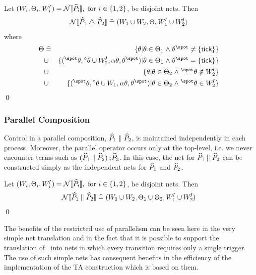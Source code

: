 \begin{definition}
Let $(W_i,\Theta_i,W^{\!I}_i) = {\mathcal{N}[\![{\widehat{P}}_i]\!]}, \text{ for } i \in \{1,2\}$, be
disjoint nets. Then
\[{\mathcal{N}[\![{\widehat{P}}_1 \mathrel{\mathord{\triangle}} {\widehat{P}}_2]\!]} \mathrel{\widehat=} (W_1 \cup W_2, \Theta, W^{\!I}_1 \cup W^{\!I}_2)\] where
\begin{eqnarray*}
\T & \defs & \{\tr | \tr \in \T_1 \land \postset{\tr} \neq \{\tickpl\}\} \\
   & \cup  & \{(\preset{\tr},\vset{\tr} \cup \WI_2,\attr{\tr},\postset{\tr}) |
                   \tr \in \T_1 \land \postset{\tr} = \{\tickpl\}\} \\
   & \cup  & \{\tr | \tr \in \T_2 \land \preset{\tr} \notin \WI_2\} \\
   & \cup  & \{(\preset{\tr},\vset{\tr} \cup \W_1,\attr{\tr},\postset{\tr}) |
                 \tr \in \T_2 \land \preset{\tr} \in \WI_2\} 
\end{eqnarray*}
\qed
\end{definition}

\subsubsection{Parallel Composition}
Control in a parallel composition, $\PP_1 \parallel \PP_2$, is maintained
independently in each process. Moreover, the parallel operator occurs
only at the top-level, i.e. we never encounter terms such as 
$(\PP_1 \parallel \PP_2) \sq \PP_3$. In this case, the net for 
$\PP_1 \parallel \PP_2$ can be constructed simply as the independent nets 
for ${\widehat{P}}_1$ and ${\widehat{P}}_2$.
\begin{definition}
Let $(W_i,\Theta_i,W^{\!I}_i) = {\mathcal{N}[\![{\widehat{P}}_i]\!]}, \text{ for } i \in \{1,2\}$, be
disjoint nets. Then
\[\mknet{\PP_1 \parallel \PP_2} \defs (\W_1 \cup \W_2, \T_1 \cup \T_2, \WI_1 \cup \WI_2)\]
\qed
\end{definition}
The benefits of the restricted use of parallelism can be seen here in
the very simple net translation and in the fact that it is possible to
support the translation of \bcandle\ into nets in which every
transition requires only a single trigger. The use of such simple nets 
has consequent benefits in the efficiency of the implementation of the
TA construction which is based on them.


